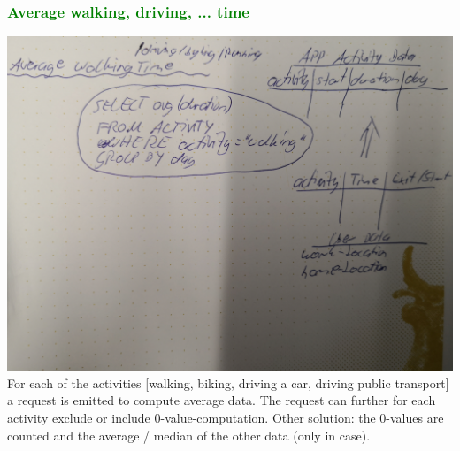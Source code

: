 \subsubsection{\textcolor{green}{Average walking, driving, ... time}}
\includegraphics[width=\textwidth]{data/data-aggregation-average-walking.jpg}
For each of the activities [walking, biking, driving a car, driving public transport] a request is emitted to compute average data.
The request can further for each activity exclude or include 0-value-computation. Other solution: the 0-values are counted and the average / median of the other data (only in case).

